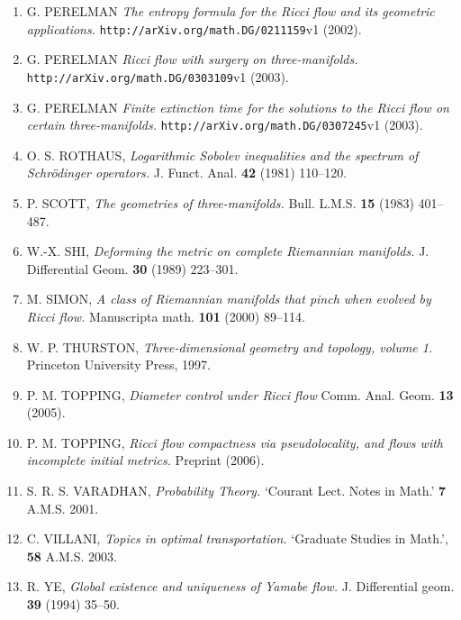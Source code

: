 \begin{enumerate}
\item G. PERELMAN \emph{The entropy formula for the Ricci flow and its geometric applications.} \texttt{http://arXiv.org/math.DG/0211159}v1 (2002).
\item G. PERELMAN \emph{Ricci flow with surgery on three-manifolds.} \texttt{http://arXiv.org/math.DG/0303109}v1 (2003).
\item G. PERELMAN \emph{Finite extinction time for the solutions to the Ricci flow on certain three-manifolds.} \texttt{http://arXiv.org/math.DG/0307245}v1 (2003).
\item O. S. ROTHAUS, \emph{Logarithmic Sobolev inequalities and the spectrum of Schr\"odinger operators.} J. Funct. Anal. \textbf{42} (1981) 110--120.
\item P. SCOTT, \emph{The geometries of three-manifolds.} Bull. L.M.S. \textbf{15} (1983) 401--487.
\item W.-X. SHI, \emph{Deforming the metric on complete Riemannian manifolds.} J. Differential Geom. \textbf{30} (1989) 223--301.
\item M. SIMON, \emph{A class of Riemannian manifolds that pinch when evolved by Ricci flow.} Manuscripta math. \textbf{101} (2000) 89--114.
\item W. P. THURSTON, \emph{Three-dimensional geometry and topology, volume 1.} Princeton University Press, 1997.
\item P. M. TOPPING, \emph{Diameter control under Ricci flow} Comm. Anal. Geom. \textbf{13} (2005).
\item P. M. TOPPING, \emph{Ricci flow compactness via pseudolocality, and flows with incomplete initial metrics.} Preprint (2006).
\item S. R. S. VARADHAN, \emph{Probability Theory.} `Courant Lect. Notes in Math.' \textbf{7} A.M.S. 2001.
\item C. VILLANI, \emph{Topics in optimal transportation.} `Graduate Studies in Math.', \textbf{58} A.M.S. 2003.
\item R. YE, \emph{Global existence and uniqueness of Yamabe flow.} J. Differential geom. \textbf{39} (1994) 35--50.
\end{enumerate}
